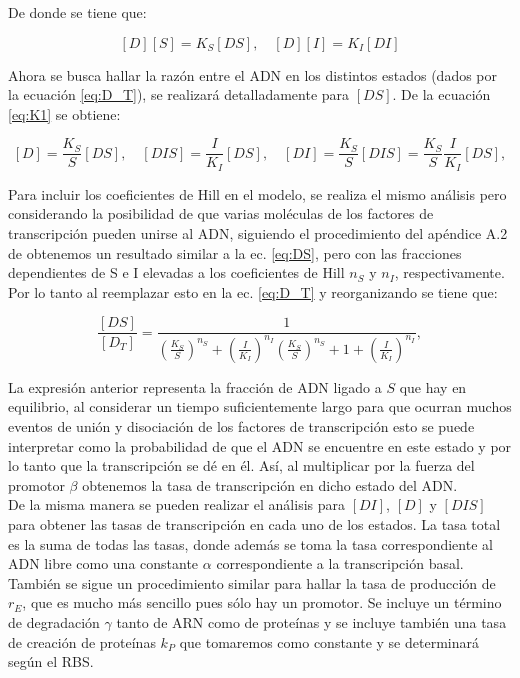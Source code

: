 \documentclass[12pt]{article}
\begin{document}
De donde se tiene que:

\begin{equation}
\label{eq:K1}
[D][S]=K_S[DS], \quad [D][I]=K_I[DI] 
\end{equation}

Ahora se busca hallar la raz\'on entre el ADN en los distintos estados (dados por la ecuaci\'on \ref{eq:D_T}), se realizar\'a detalladamente para $[DS]$. De la ecuaci\'on \ref{eq:K1} se obtiene:

\begin{equation}
\label{eq:DS}
[D] = \frac{K_S}{S}[DS], \quad [DIS] = \frac{I}{K_I}[DS], \quad [DI]=\frac{K_S}{S}[DIS]=\frac{K_S}{S}\frac{I}{K_I}[DS],
\end{equation}

Para incluir los coeficientes de Hill en el modelo, se realiza el mismo an\'alisis pero considerando la posibilidad de que varias mol\'eculas de los factores de transcripci\'on pueden unirse al ADN, siguiendo el procedimiento del ap\'endice A.2 de \cite{alon06} obtenemos un resultado similar a la ec. \ref{eq:DS}, pero con las fracciones dependientes de S e I elevadas a los coeficientes de Hill $n_S$ y $n_I$, respectivamente. Por lo tanto al reemplazar esto en la ec. \ref{eq:D_T} y reorganizando se tiene que:

\begin{equation}
\frac{[DS]}{[D_T]} = \frac{1}{\left( \frac{K_S}{S} \right)^{n_S} + \left( \frac{I}{K_I} \right)^{n_I} \left( \frac{K_S}{S} \right)^{n_S} + 1 + \left( \frac{I}{K_I} \right)^{n_I}},
\end{equation}

La expresi\'on anterior representa la fracci\'on de ADN ligado a $S$ que hay en equilibrio, al considerar un tiempo suficientemente largo para que ocurran muchos eventos de uni\'on y disociaci\'on de los factores de transcripci\'on esto se puede interpretar como la probabilidad de que el ADN se encuentre en este estado y por lo tanto que la transcripci\'on se d\'e en \'el. As\'i, al multiplicar por la fuerza del promotor $\beta$ obtenemos la tasa de transcripci\'on en dicho estado del ADN.\\

De la misma manera se pueden realizar el an\'alisis para $[DI]$, $[D]$ y $[DIS]$ para obtener las tasas de transcripci\'on en cada uno de los estados. La tasa total es la suma de todas las tasas, donde adem\'as se toma la tasa correspondiente al ADN libre como una constante $\alpha$ correspondiente a la transcripci\'on basal. Tambi\'en se sigue un procedimiento similar para hallar la tasa de producci\'on de $r_E$, que es mucho m\'as sencillo pues s\'olo hay un promotor. Se incluye un t\'ermino de degradaci\'on $\gamma$ tanto de ARN como de prote\'inas y se incluye tambi\'en una tasa de creaci\'on de prote\'inas $k_P$ que tomaremos como constante y se determinar\'a seg\'un el RBS.\\
\end{document}
